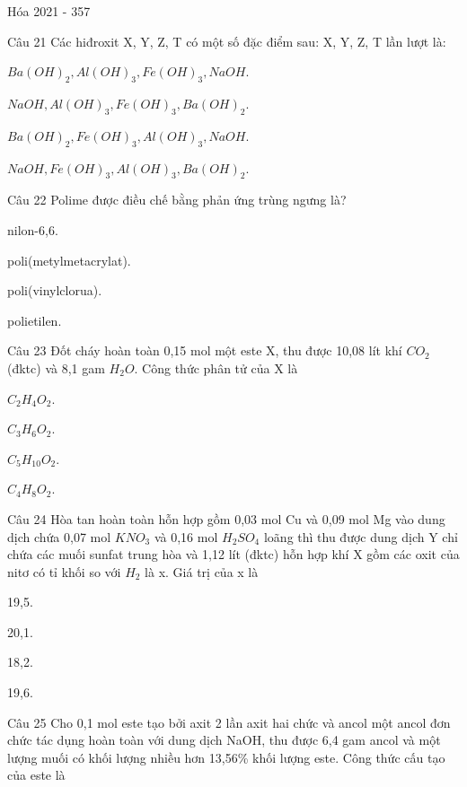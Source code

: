 \documentclass{book}
\begin{document}
\begin{quiz}{Hóa 2021 - 357}
\begin{multi}[points=1]{Câu 21}
 Các hiđroxit X, Y, Z, T có một số đặc điểm sau: 
X, Y, Z, T lần lượt là: 

\item  $Ba(OH)_2, Al(OH)_3, Fe(OH)_3, NaOH$.	
\item  $NaOH, Al(OH)_3, Fe(OH)_3, Ba(OH)_2$.	
\item  $Ba(OH)_2, Fe(OH)_3, Al(OH)_3, NaOH$.	
\item*  $NaOH, Fe(OH)_3, Al(OH)_3, Ba(OH)_2$.
\end{multi}

\begin{multi}[points=1]{Câu 22}
 Polime được điều chế bằng phản ứng trùng ngưng là? 

\item*  nilon-6,6.	
\item  poli(metylmetacrylat).	
\item  poli(vinylclorua).	
\item  polietilen.
\end{multi}

\begin{multi}[points=1]{Câu 23}
 Đốt cháy hoàn toàn 0,15 mol một este X, thu được 10,08 lít khí $CO_2$ (đktc) và 8,1 gam $H_2O$. Công thức phân tử của X là 

\item  $C_2H_4O_2$.	
\item*  $C_3H_6O_2$.	
\item  $C_5H_{10}O_2$.	
\item  $C_4H_8O_2$.
\end{multi}

\begin{multi}[points=1]{Câu 24}
 Hòa tan hoàn toàn hỗn hợp gồm 0,03 mol Cu và 0,09 mol Mg vào dung dịch chứa 0,07 mol $KNO_3$ và 0,16 mol $H_2SO_4$ loãng thì thu được dung dịch Y chỉ chứa các muối sunfat trung hòa và 1,12 lít (đktc) hỗn hợp khí X gồm các oxit của nitơ có tỉ khối so với $H_2$ là x. Giá trị của x là

\item  19,5.	
\item  20,1.	
\item  18,2.	
\item*  19,6.
\end{multi}

\begin{multi}[points=1]{Câu 25}
 Cho 0,1 mol este tạo bởi axit 2 lần axit hai chức và ancol một  ancol đơn chức tác dụng hoàn toàn với dung dịch NaOH, thu được 6,4 gam ancol và một lượng muối có khối lượng nhiều hơn 13,56\% khối lượng este. Công thức cấu tạo của este là 


\end{multi}
\end{quiz}
\end{document}
